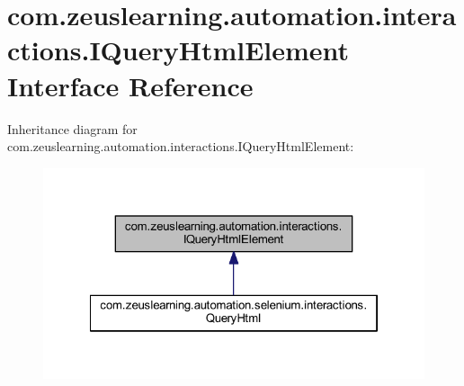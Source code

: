 \hypertarget{interfacecom_1_1zeuslearning_1_1automation_1_1interactions_1_1IQueryHtmlElement}{}\section{com.\+zeuslearning.\+automation.\+interactions.\+I\+Query\+Html\+Element Interface Reference}
\label{interfacecom_1_1zeuslearning_1_1automation_1_1interactions_1_1IQueryHtmlElement}


Inheritance diagram for com.\+zeuslearning.\+automation.\+interactions.\+I\+Query\+Html\+Element\+:\nopagebreak
\begin{figure}[H]
\begin{center}
\leavevmode
\includegraphics[width=322pt]{d5/dd3/interfacecom_1_1zeuslearning_1_1automation_1_1interactions_1_1IQueryHtmlElement__inherit__graph}
\end{center}
\end{figure}
